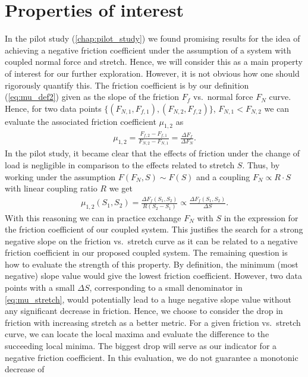 \section{Properties of interest} 
In the pilot study (\cref{chap:pilot_study}) we found promising results for the idea of achieving a negative friction coefficient under the assumption of a system with coupled normal force and stretch. Hence, we will consider this as a main property of interest for our further exploration. However, it is not obvious how one should rigorously quantify this. The friction coefficient is by our definition (\cref{eq:mu_def2}) given as the slope of the friction $F_f$ vs.\ normal force $F_N$ curve. Hence, for two data points $\{(F_{N,1}, F_{f,1}), (F_{N,2}, F_{f,2})\}$, $F_{N,1} < F_{N,2}$ we can evaluate the associated friction coefficient $\mu_{1,2}$ as 
\begin{align*}
  \mu_{1,2} = \frac{F_{f,2} - F_{f,1}}{F_{N,2} - F_{N,1}} = \frac{\Delta F_f}{\Delta F_N}.
\end{align*}
In the pilot study, it became clear that the effects of friction under the
change of load is negligible in comparison to the effects related to stretch $S$.
Thus, by working under the assumption $F(F_N, S) \sim F(S)$ and a coupling $F_N
\propto R\cdot S$ with linear coupling ratio $R$ we get 
\begin{align}
  \mu_{1,2}(S_1, S_2) = \frac{\Delta F_{f}(S_1, S_2)}{R(S_2 - S_1)} \propto \frac{\Delta F_{f}(S_1, S_2)}{\Delta S}.
  \label{eq:mu_stretch}
\end{align}
With this reasoning we can in practice exchange $F_N$ with $S$ in the expression
for the friction coefficient of our coupled system. This justifies the search
for a strong negative slope on the friction vs.\ stretch curve as it can be
related to a negative friction coefficient in our proposed coupled system. The
remaining question is how to evaluate the strength of this property. By
definition, the minimum (most negative) slope value would give the lowest
friction coefficient. However, two data points with a small $\Delta S$,
corresponding to a small denominator in \cref{eq:mu_stretch}, would potentially
lead to a huge negative slope value without any significant decrease in
friction. Hence, we choose to consider the drop in friction with increasing
stretch as a better metric. For a given friction vs.\ stretch curve, we can
locate the local maxima and evaluate the difference to the succeeding local
minima. The biggest drop will serve as our indicator for a negative friction
coefficient. In this evaluation, we do not guarantee a monotonic decrease of
